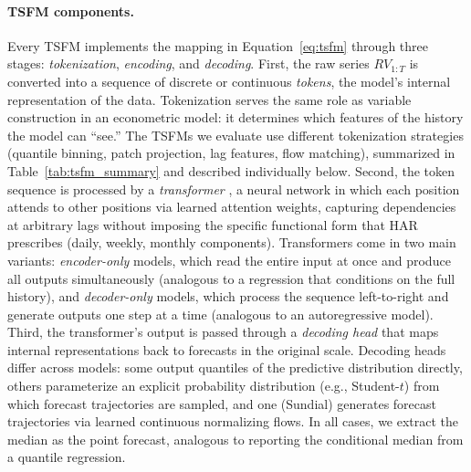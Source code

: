 \documentclass[12pt]{article}
\begin{document}
\paragraph{TSFM components.}
Every TSFM implements the mapping in Equation~\eqref{eq:tsfm} through three stages: \emph{tokenization}, \emph{encoding}, and \emph{decoding}. First, the raw series $RV_{1:T}$ is converted into a sequence of discrete or continuous \emph{tokens}, the model's internal representation of the data. Tokenization serves the same role as variable construction in an econometric model: it determines which features of the history the model can ``see.'' The TSFMs we evaluate use different tokenization strategies (quantile binning, patch projection, lag features, flow matching), summarized in Table~\ref{tab:tsfm_summary} and described individually below. Second, the token sequence is processed by a \emph{transformer} \citep{vaswani2017}, a neural network in which each position attends to other positions via learned attention weights, capturing dependencies at arbitrary lags without imposing the specific functional form that HAR prescribes (daily, weekly, monthly components). Transformers come in two main variants: \emph{encoder-only} models, which read the entire input at once and produce all outputs simultaneously (analogous to a regression that conditions on the full history), and \emph{decoder-only} models, which process the sequence left-to-right and generate outputs one step at a time (analogous to an autoregressive model). Third, the transformer's output is passed through a \emph{decoding head} that maps internal representations back to forecasts in the original scale. Decoding heads differ across models: some output quantiles of the predictive distribution directly, others parameterize an explicit probability distribution (e.g., Student-$t$) from which forecast trajectories are sampled, and one (Sundial) generates forecast trajectories via learned continuous normalizing flows. In all cases, we extract the median as the point forecast, analogous to reporting the conditional median from a quantile regression.
\end{document}

